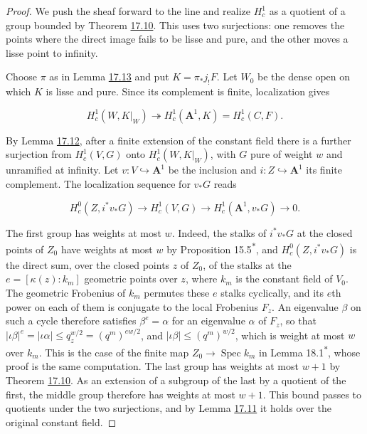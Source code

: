 \documentclass[11pt]{article}
\newcommand{\bpout}[1]{#1\textsuperscript{\hyperlink{bp-outside}{\ensuremath{\ast}}}}
\begin{document}
\begin{proof}[{Proof}]\label{bp45}%
We push the sheaf forward to the line and realize \(H^1_c\) as a quotient of a group bounded by Theorem \hyperref[bp30]{17.10}. This uses two surjections: one removes the points where the direct image fails to be lisse and pure, and the other moves a lisse point to infinity.

Choose \(\pi\) as in Lemma \hyperref[bp41]{17.13} and put \(K=\pi_*j_!F\). Let \(W_0\) be the dense open on which \(K\) is lisse and pure. Since its complement is finite, localization gives

\[
H_c^1(W,K|_W)\twoheadrightarrow
H_c^1(\mathbf A^1,K)=H_c^1(C,F).
\]

By Lemma \hyperref[bp38]{17.12}, after a finite extension of the constant field there is a further surjection from \(H_c^1(V,G)\) onto \(H_c^1(W,K|_W)\), with \(G\) pure of weight \(w\) and unramified at infinity. Let \(v:V\hookrightarrow\mathbf A^1\) be the inclusion and \(i:Z\hookrightarrow\mathbf A^1\) its finite complement. The localization sequence for \(v_*G\) reads

\[
H_c^0(Z,i^*v_*G)\longrightarrow H_c^1(V,G)
\longrightarrow H_c^1(\mathbf A^1,v_*G)\longrightarrow0.
\]

The first group has weights at most \(w\). Indeed, the stalks of \(i^*v_*G\) at the closed points of \(Z_0\) have weights at most \(w\) by Proposition \bpout{15.5}, and \(H_c^0(Z,i^*v_*G)\) is the direct sum, over the closed points \(z\) of \(Z_0\), of the stalks at the \(e=[\kappa(z):k_m]\) geometric points over \(z\), where \(k_m\) is the constant field of \(V_0\). The geometric Frobenius of \(k_m\) permutes these \(e\) stalks cyclically, and its \(e\)th power on each of them is conjugate to the local Frobenius \(F_z\). An eigenvalue \(\beta\) on such a cycle therefore satisfies \(\beta^e=\alpha\) for an eigenvalue \(\alpha\) of \(F_z\), so that \(|\iota\beta|^e=|\iota\alpha|\le q_z^{w/2}=(q^m)^{ew/2}\), and \(|\iota\beta|\le(q^m)^{w/2}\), which is weight at most \(w\) over \(k_m\). This is the case of the finite map \(Z_0\to\operatorname{Spec}k_m\) in Lemma \bpout{18.1}, whose proof is the same computation. The last group has weights at most \(w+1\) by Theorem \hyperref[bp30]{17.10}. As an extension of a subgroup of the last by a quotient of the first, the middle group therefore has weights at most \(w+1\). This bound passes to quotients under the two surjections, and by Lemma \hyperref[bp35]{17.11} it holds over the original constant field.
\end{proof}
\end{document}
